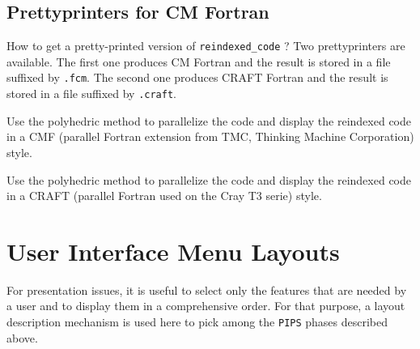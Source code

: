\documentclass[a4paper]{report}
\newenvironment{PipsMake}{\begin{alltt}}{\end{alltt}}
\newenvironment{PipsPass}[1]{\label{pass:#1}}{}
\newcommand{\Pips}{\texttt{PIPS}}
\begin{document}
\section{Prettyprinters for CM Fortran}

How to get a pretty-printed version of \verb+reindexed_code+ ? Two
prettyprinters are available. The first one produces CM Fortran and the
result is stored in a file suffixed by \verb+.fcm+. The second one
produces CRAFT Fortran and the result is stored in a file suffixed by
\verb+.craft+.


\begin{PipsPass}{print_parallelizedCMF_code}
Use the polyhedric method to parallelize the code and display the
reindexed code in a CMF (parallel Fortran extension from TMC, Thinking
Machine Corporation) style.
\end{PipsPass}


\begin{PipsPass}{print_parallelizedCRAFT_code}
Use the polyhedric method to parallelize the code and display the
reindexed code in a CRAFT (parallel Fortran used on the Cray T3 serie)
style.
\end{PipsPass}



\chapter{User Interface Menu Layouts}
\label{sec:menu_layout}
\label{section-user-interface-menu-layouts}

For presentation issues, it is useful to select only the features that
are needed by a user and to display them in a comprehensive order. For
that purpose, a layout description mechanism is used here to pick
among the \Pips{} phases described above.
\end{document}
